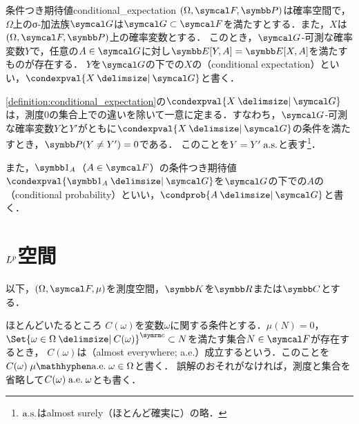 \documentclass[../../main]{subfiles}
\begin{document}
\begin{definition}{条件つき期待値}{conditional_expectation}
  \((\Omega,\sigmaalg{F},\prob)\)は確率空間で，\(\Omega\)上のσ‐加法族\(\sigmaalg{G}\)は\(\sigmaalg{G}\subset\sigmaalg{F}\)を満たすとする．また，\(X\)は\((\Omega,\sigmaalg{F},\prob)\)上の確率変数とする．
  このとき，\(\sigmaalg{G}\)‐可測な確率変数\(Y\)で，任意の\(A\in\sigmaalg{G}\)に対し\(\expval[Y,A]=\expval[X,A]\)を満たすものが存在する\footnotemark ．
  \(Y\)を\(\sigmaalg{G}\)の下での\(X\)の（conditional expectation）といい，\(\condexpval{X\given\sigmaalg{G}}\)と書く．
\end{definition}
\cref{definition:conditional_expectation}の\(\condexpval{X\given\sigmaalg{G}}\)は，測度\(0\)の集合上での違いを除いて一意に定まる．すなわち，\(\sigmaalg{G}\)‐可測な確率変数\(Y\)と\(Y'\)がともに\(\condexpval{X\given\sigmaalg{G}}\)の条件を満たすとき，\(\prob(Y\neq Y')=0\)である．
このことを\(Y=Y'\almostsurely\)と表す\footnote{\(\almostsurely\)はalmost surely（ほとんど確実に）の略．}．

また，\(\indicator_A\)（\(A\in\sigmaalg{F}\)）の条件つき期待値\(\condexpval{\indicator_A\given\sigmaalg{G}}\)を\(\sigmaalg{G}\)の下での\(A\)の（conditional probability）といい，\(\condprob{A\given\sigmaalg{G}}\)と書く．

\section{\texorpdfstring{\(L^p\)空間}{Lp空間}}

以下，\((\Omega,\sigmaalg{F},\mu)\)を測度空間，\(\numset{K}\)を\(\numset{R}\)または\(\numset{C}\)とする．

\begin{definition}{ほとんどいたるところ}{}
  \(C(\omega)\)を変数\(\omega\)に関する条件とする．\(\mu(N)=0\)，\(\scomp{\Set{\omega\in\Omega\given C(\omega)}}\subset N\)を満たす集合\(N\in\sigmaalg{F}\)が存在するとき，
  \(C(\omega)\)は（almost everywhere; a{.}e{.}）成立するという．このことを\(C(\omega)\almosteverywhere[\mu]\omega\in\Omega\)と書く．
  誤解のおそれがなければ，測度と集合を省略して\(C(\omega)\almosteverywhere\omega\)とも書く．
\end{definition}
\end{document}
